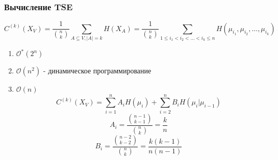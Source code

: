 \documentclass{beamer}
\begin{document}
\begin{frame}
	\frametitle{Вычисление TSE}
		\[
			C^{(k)}(X_V) = \frac{1}{\binom{n}{k}}\sum\limits_{A\subseteq V,|A|=k}H(X_A) =
			\frac{1}{\binom{n}{k}}\sum\limits_{1 \le i_1 < i_2 < \ldots < i_k \le n}H(\mu_{i_1}, \mu_{i_2}, \ldots, \mu_{i_k})
		\]
		\begin{enumerate}
			\item $\mathcal{O^*}(2^n)$
			\item $\mathcal{O}(n^2)$ - динамическое программирование
			\item $\mathcal{O}(n)$
				\[
					C^{(k)}(X_V) = \sum\limits_{i=1}^{n}A_iH(\mu_i) + \sum\limits_{i=2}^{n}B_iH(\mu_i|\mu_{i-1})
				\]
				\[
					A_i = \frac{\binom{n-1}{k-1}}{\binom{n}{k}} = \frac{k}{n}
				\]
				\[
					B_i = \frac{\binom{n-2}{k-2}}{\binom{n}{k}} = \frac{k(k-1)}{n(n-1)}
				\]
		\end{enumerate}
\end{frame}
\end{document}
